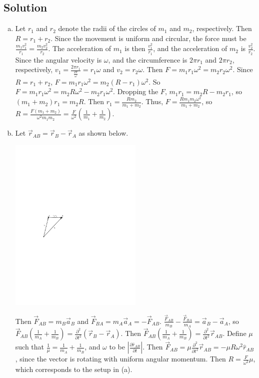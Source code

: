 \documentclass[solutions]{esg8012pset}
\begin{document}
\subsection*{Solution}
  \begin{enumerate}[a)]
    \item Let $r_1$ and $r_2$ denote the radii of the circles of $m_1$ and $m_2$, respectively.  Then $R = r_1 + r_2$.  Since the movement is uniform and circular, the force must be $\frac{m_1 v_1^2}{r_1} = \frac{m_2 v_2^2}{r_2}$.  The acceleration of $m_1$ is then $\frac{v_1^2}{r_1}$, and the acceleration of $m_2$ is $\frac{v_2^2}{r_2}$.  Since the angular velocity is $\omega$, and the circumference is $2\pi r_1$ and $2\pi r_2$, respectively, $v_1 = \frac{2\pi r_1}{\frac{2\pi}{\omega}} = r_1 \omega$ and $v_2 = r_2 \omega$.  Then $F = m_1 r_1 \omega^2 =  m_2 r_2 \omega^2$.  Since $R = r_1 + r_2$, $F = m_1 r_1 \omega^2 = m_2 (R - r_1) \omega^2$.  So $F = m_1 r_1 \omega^2 = m_2 R \omega^2 - m_2 r_1 \omega^2$.  Dropping the $F$, $m_1 r_1 = m_2 R - m_2 r_1$, so $(m_1 + m_2)r_1 = m_2 R$.  Then $r_1 = \frac{R m_2}{m_1 + m_2}$.  Thus, $F =  \frac{R m_1 m_2\omega^2}{m_1 + m_2}$, so $R = \frac{F(m_1+m_2)}{\omega^2 m_1 m_2} = \frac{F}{\omega^2}\left(\frac{1}{m_1}+\frac{1}{m_2}\right)$.
    \item Let $\vec r_{AB} = \vec r_B - \vec r_A$ as shown below. \begin{center}\includegraphics[width=0.5\textwidth]{2009-09-25_Diagram_10}\end{center}  Then $\vec F_{AB} = m_B \vec a_B$ and $\vec F_{BA} = m_A \vec a_A = -\vec F_{AB}$.  $\frac{\vec F_{AB}}{m_B} - \frac{\vec F_{BA}}{m_A} = \vec a_B - \vec a_A$, so $\vec F_{AB}\left(\frac{1}{m_A} + \frac{1}{m_B}\right) = \frac{\partial^2}{\partial t^2}(\vec r_B - \vec r_A)$.  Then $\vec F_{AB}\left(\frac{1}{m_A} + \frac{1}{m_B}\right) = \frac{\partial^2}{\partial t^2}\vec r_{AB}$.  Define $\mu$ such that $\frac{1}{\mu} = \frac{1}{m_A} + \frac{1}{m_B}$, and $\omega$ to be $\left\vert \frac{\partial \hat r_{AB}}{\partial t}\right\vert$.  Then $\vec F_{AB} = \mu \frac{\partial^2}{\partial t^2}\vec r_{AB} = -\mu R\omega^2\hat r_{AB}$, since the vector is rotating with uniform angular momentum.  Then $R = \frac{F}{\omega^2}\mu$, which corresponds to the setup in (a).
  \end{enumerate}
\end{document}
